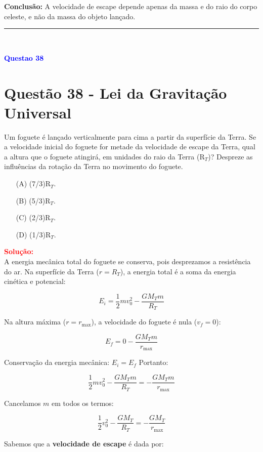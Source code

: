 \documentclass[a4paper,12pt]{article}
\begin{document}
\noindent
\textbf{Conclusão:} A velocidade de escape depende apenas da massa e do raio do corpo celeste, e não da massa do objeto lançado.

\noindent\rule{\linewidth}{0.6pt}\\

\begin{flushleft}
\textbf{\textcolor{blue}{\Large Questao 38}}\\
\noindent
\section{Quest\~ao 38 - Lei da Gravitação Universal}
Um foguete é lançado verticalmente para cima a partir da
superfície da Terra. Se a velocidade inicial do foguete for
metade da velocidade de escape da Terra, qual a altura que
o foguete atingirá, em unidades do raio da Terra (R$_{T}$)?
Despreze as influências da rotação da Terra no movimento
do foguete.

\begin{itemize}
\item[(A)] (7/3)R$_{T}$.
\item[(B)] (5/3)R$_{T}$.
\item[(C)] (2/3)R$_{T}$.
\item[(D)] (1/3)R$_{T}$.
\end{itemize}

\vspace{0.5cm}

\textcolor{red}{\textbf{Solução:}}\\

A energia mecânica total do foguete se conserva, pois desprezamos a resistência do ar.  
Na superfície da Terra (\(r = R_T\)), a energia total é a soma da energia cinética e potencial:  

\[
E_i = \frac{1}{2} m v_0^2 - \frac{G M_T m}{R_T}
\]

Na altura máxima (\(r = r_{\text{max}}\)), a velocidade do foguete é nula (\(v_f = 0\)):  

\[
E_f = 0 - \frac{G M_T m}{r_{\text{max}}}
\]

Conservação da energia mecânica: \(E_i = E_f\)  
Portanto:

\[
\frac{1}{2} m v_0^2 - \frac{G M_T m}{R_T} = - \frac{G M_T m}{r_{\text{max}}}
\]

Cancelamos \(m\) em todos os termos:

\[
\frac{1}{2} v_0^2 - \frac{G M_T}{R_T} = - \frac{G M_T}{r_{\text{max}}}
\]

Sabemos que a \textbf{velocidade de escape} é dada por:


\end{flushleft}
\end{document}
